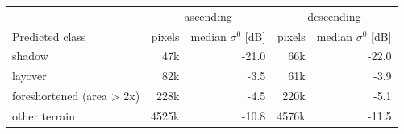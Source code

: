\begin{tabular}{lrrrr}\toprule
 & \multicolumn{2}{c}{ascending} & \multicolumn{2}{c}{descending}\\
Predicted class & pixels & median $\sigma^0$ [dB] & pixels & median $\sigma^0$ [dB]\\\midrule
shadow & 47k & -21.0 & 66k & -22.0 \\
layover & 82k & -3.5 & 61k & -3.9 \\
foreshortened (area > 2x) & 228k & -4.5 & 220k & -5.1 \\
other terrain & 4525k & -10.8 & 4576k & -11.5 \\
\bottomrule\end{tabular}
